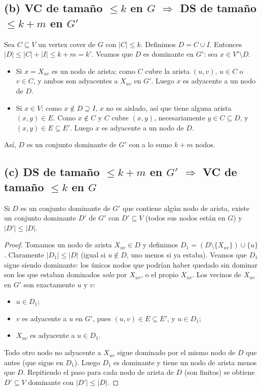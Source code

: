 \subsection*{(b) VC de tamaño $\le k$ en $G$ $\Rightarrow$ DS de tamaño $\le k+m$ en $G'$}

Sea $C\subseteq V$ un vertex cover de $G$ con $|C|\le k$. Definimos $D=C\cup I$. Entonces
$|D|\le|C|+|I|\le k+m=k'$. Veamos que $D$ es dominante en $G'$: sea $x\in V'\setminus D$.
\begin{itemize}
  \item Si $x=X_{uv}$ es un nodo de arista: como $C$ cubre la arista $(u,v)$, $u\in C$ o $v\in C$, y ambos son
  adyacentes a $X_{uv}$ en $G'$. Luego $x$ es adyacente a un nodo de $D$.
  \item Si $x\in V$: como $x\notin D\supseteq I$, $x$ no es aislado, así que tiene alguna arista $(x,y)\in E$.
  Como $x\notin C$ y $C$ cubre $(x,y)$, necesariamente $y\in C\subseteq D$, y $(x,y)\in E\subseteq E'$. Luego
  $x$ es adyacente a un nodo de $D$.
\end{itemize}
Así, $D$ es un conjunto dominante de $G'$ con a lo sumo $k+m$ nodos.

\subsection*{(c) DS de tamaño $\le k+m$ en $G'$ $\Rightarrow$ VC de tamaño $\le k$ en $G$}

\begin{lema}[Sugerencia]
Si $D$ es un conjunto dominante de $G'$ que contiene algún nodo de arista, existe un conjunto dominante $D'$
de $G'$ con $D'\subseteq V$ (todos sus nodos están en $G$) y $|D'|\le|D|$.
\end{lema}
\begin{proof}
Tomamos un nodo de arista $X_{uv}\in D$ y definimos $D_1=(D\setminus\{X_{uv}\})\cup\{u\}$. Claramente
$|D_1|\le|D|$ (igual si $u\notin D$, uno menos si ya estaba). Veamos que $D_1$ sigue siendo dominante: los
únicos nodos que podrían haber quedado sin dominar son los que estaban dominados \emph{solo} por $X_{uv}$, o el
propio $X_{uv}$. Los vecinos de $X_{uv}$ en $G'$ son exactamente $u$ y $v$:
\begin{itemize}
  \item $u\in D_1$;
  \item $v$ es adyacente a $u$ en $G'$, pues $(u,v)\in E\subseteq E'$, y $u\in D_1$;
  \item $X_{uv}$ es adyacente a $u\in D_1$.
\end{itemize}
Todo otro nodo no adyacente a $X_{uv}$ sigue dominado por el mismo nodo de $D$ que antes (que sigue en $D_1$).
Luego $D_1$ es dominante y tiene un nodo de arista menos que $D$. Repitiendo el paso para cada nodo de arista
de $D$ (son finitos) se obtiene $D'\subseteq V$ dominante con $|D'|\le|D|$.
\end{proof}

